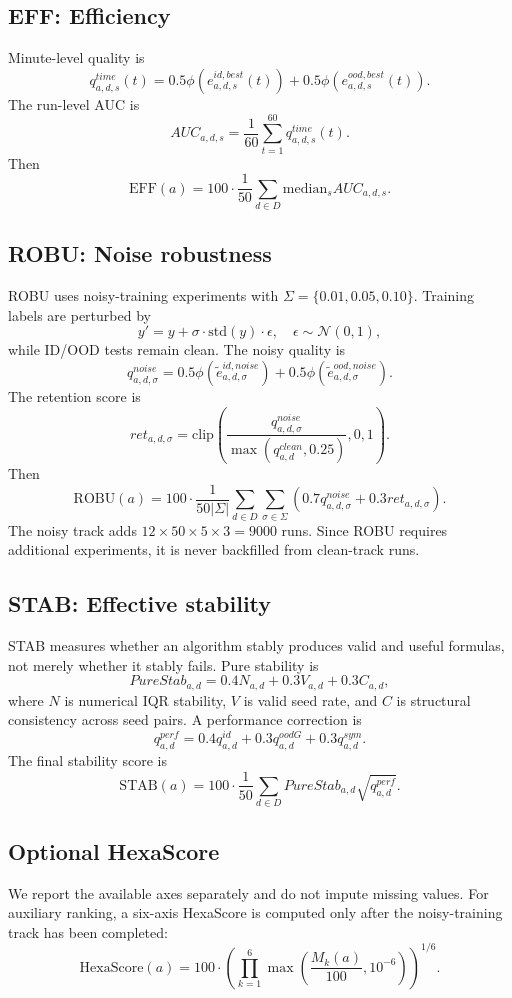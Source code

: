 \subsection{EFF: Efficiency}
Minute-level quality is
\[
q^{time}_{a,d,s}(t)=0.5\phi(e^{id,best}_{a,d,s}(t))+0.5\phi(e^{ood,best}_{a,d,s}(t)).
\]
The run-level AUC is
\[
AUC_{a,d,s}=\frac{1}{60}\sum_{t=1}^{60}q^{time}_{a,d,s}(t).
\]
Then
\[
\mathrm{EFF}(a)=100\cdot\frac{1}{50}\sum_{d\in D}\mathrm{median}_s AUC_{a,d,s}.
\]

\subsection{ROBU: Noise robustness}
ROBU uses noisy-training experiments with $\Sigma=\{0.01,0.05,0.10\}$. Training labels are perturbed by
\[
y'=y+\sigma\cdot\mathrm{std}(y)\cdot\epsilon,\quad \epsilon\sim\mathcal N(0,1),
\]
while ID/OOD tests remain clean. The noisy quality is
\[
q^{noise}_{a,d,\sigma}=0.5\phi(\tilde e^{id,noise}_{a,d,\sigma})+0.5\phi(\tilde e^{ood,noise}_{a,d,\sigma}).
\]
The retention score is
\[
ret_{a,d,\sigma}=\mathrm{clip}\left(\frac{q^{noise}_{a,d,\sigma}}{\max(q^{clean}_{a,d},0.25)},0,1\right).
\]
Then
\[
\mathrm{ROBU}(a)=100\cdot\frac{1}{50|\Sigma|}\sum_{d\in D}\sum_{\sigma\in\Sigma}(0.7q^{noise}_{a,d,\sigma}+0.3ret_{a,d,\sigma}).
\]
The noisy track adds $12\times 50\times 5\times 3=9000$ runs. Since ROBU requires additional experiments, it is never backfilled from clean-track runs.

\subsection{STAB: Effective stability}
STAB measures whether an algorithm stably produces valid and useful formulas, not merely whether it stably fails. Pure stability is
\[
PureStab_{a,d}=0.4N_{a,d}+0.3V_{a,d}+0.3C_{a,d},
\]
where $N$ is numerical IQR stability, $V$ is valid seed rate, and $C$ is structural consistency across seed pairs. A performance correction is
\[
q^{perf}_{a,d}=0.4q^{id}_{a,d}+0.3q^{oodG}_{a,d}+0.3q^{sym}_{a,d}.
\]
The final stability score is
\[
\mathrm{STAB}(a)=100\cdot\frac{1}{50}\sum_{d\in D} PureStab_{a,d}\sqrt{q^{perf}_{a,d}}.
\]

\subsection{Optional HexaScore}
We report the available axes separately and do not impute missing \rob{} values. For auxiliary ranking, a six-axis HexaScore is computed only after the noisy-training track has been completed:
\[
\mathrm{HexaScore}(a)=100\cdot\left(\prod_{k=1}^{6}\max\left(\frac{M_k(a)}{100},10^{-6}\right)\right)^{1/6}.
\]
